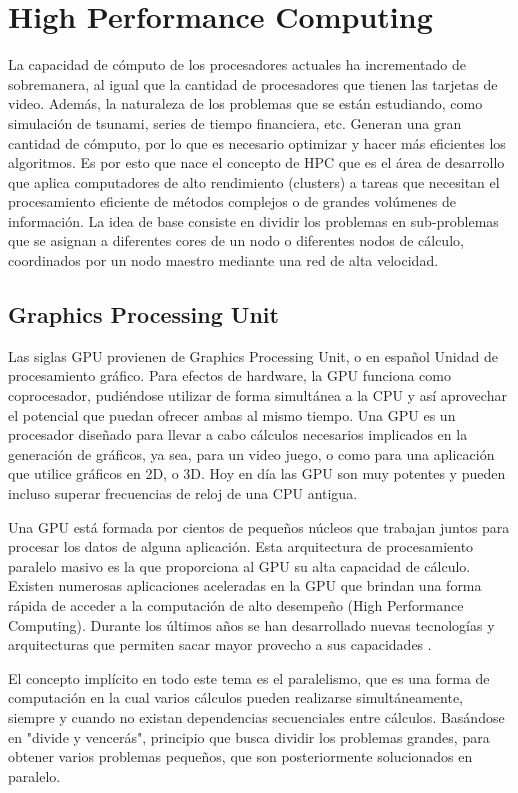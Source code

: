 \section{High Performance Computing}

La capacidad de cómputo de los procesadores actuales ha incrementado de sobremanera, al igual que la cantidad de procesadores que tienen las tarjetas de video. Además, la
naturaleza de los problemas que se están estudiando, como simulación de tsunami, series de tiempo financiera, etc. Generan una gran cantidad de cómputo, por lo que es
necesario optimizar y hacer más eficientes los algoritmos. Es por esto que nace el concepto de HPC que es el área de desarrollo que aplica computadores de alto rendimiento 
(clusters) a tareas que necesitan el procesamiento eficiente de métodos complejos o de grandes volúmenes de información. La idea de base consiste en dividir los problemas 
en sub-problemas que se asignan a diferentes cores de un nodo o diferentes nodos de cálculo, coordinados por un nodo maestro mediante una red de alta velocidad. 

\subsection{Graphics Processing Unit}
Las siglas GPU provienen de Graphics Processing Unit, o en español Unidad de procesamiento gráfico. Para efectos de hardware, la GPU funciona como coprocesador,
pudiéndose utilizar de forma simultánea a la CPU y así aprovechar el potencial que puedan ofrecer ambas al mismo tiempo. Una GPU es un procesador
diseñado para llevar a cabo cálculos necesarios implicados en la generación de gráficos, ya sea, para un video juego, o como para una aplicación que utilice
gráficos en 2D, o 3D. Hoy en día las GPU son muy potentes y pueden incluso superar frecuencias de reloj de una CPU antigua.

Una GPU está formada por cientos de pequeños núcleos que trabajan juntos para procesar los datos de alguna aplicación. Esta arquitectura de procesamiento paralelo
masivo es la que proporciona al GPU su alta capacidad de cálculo. Existen numerosas aplicaciones aceleradas en la GPU que brindan una forma rápida de acceder
a la computación de alto desempeño (High Performance Computing). Durante los últimos años se han desarrollado nuevas tecnologías y arquitecturas
que permiten sacar mayor provecho a sus capacidades \cite{owens2007gpu}.

El concepto implícito en todo este tema es el paralelismo, que es una forma de computación en la cual varios cálculos pueden realizarse simultáneamente,
siempre y cuando no existan dependencias secuenciales entre cálculos. Basándose en "divide y vencerás", principio que busca dividir los problemas grandes, para
obtener varios problemas pequeños, que son posteriormente solucionados en paralelo.

